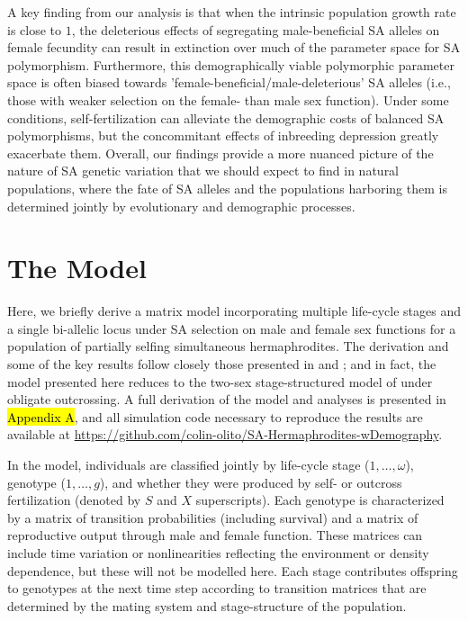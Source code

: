 \documentclass[11pt]{article}
\begin{document}
A key finding from our analysis is that when the intrinsic population growth rate is close to $1$, the deleterious effects of segregating male-beneficial SA alleles on female fecundity can result in extinction over much of the parameter space for SA polymorphism. Furthermore, this demographically viable polymorphic parameter space is often biased towards 'female-beneficial/male-deleterious' SA alleles (i.e., those with weaker selection on the female- than male sex function). Under some conditions, self-fertilization can alleviate the demographic costs of balanced SA polymorphisms, but the concommitant effects of inbreeding depression greatly exacerbate them. Overall, our findings provide a more nuanced picture of the nature of SA genetic variation that we should expect to find in natural populations, where the fate of SA alleles and the populations harboring them is determined jointly by evolutionary and demographic processes.


\section*{The Model}

Here, we briefly derive a matrix model incorporating multiple life-cycle stages and a single bi-allelic locus under SA selection on male and female sex functions for a population of partially selfing simultaneous hermaphrodites. The derivation and some of the key results follow closely those presented in \citet{deVriesCaswell2019a} and \citet{deVriesCaswell2019b}; and in fact, the model presented here reduces to the two-sex stage-structured model of \citet{deVriesCaswell2019b} under obligate outcrossing. A full derivation of the model and analyses is presented in \hl{Appendix A}, and all simulation code necessary to reproduce the results are available at \url{https://github.com/colin-olito/SA-Hermaphrodites-wDemography}.

In the model, individuals are classified jointly by life-cycle stage ($1, \ldots, \omega$), genotype ($1, \ldots, g$), and whether they were produced by self- or outcross fertilization (denoted by $S$ and $X$ superscripts). Each genotype is characterized by a matrix of transition probabilities (including survival) and a matrix of reproductive output through male and female function. These matrices can include time variation or nonlinearities reflecting the environment or density dependence, but these will not be modelled here. Each stage contributes offspring to genotypes at the next time step according to transition matrices that are determined by the mating system and stage-structure of the population.
\end{document}
